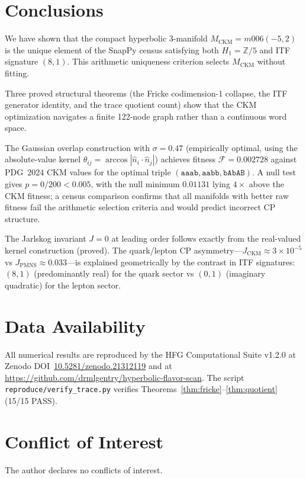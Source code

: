 \documentclass[11pt,a4paper]{article}
\theoremstyle{remark}
\newcommand{\MCKM}{M_{\mathrm{CKM}}}
\newcommand{\Zfive}{\mathbb{Z}/5}
\begin{document}
\section{Conclusions}
\label{sec:concl}

We have shown that the compact hyperbolic 3-manifold
$\MCKM = m006(-5,2)$ is the unique element of the SnapPy census
satisfying both $H_1 = \Zfive$ and ITF signature $(8,1)$.
This arithmetic uniqueness criterion selects $\MCKM$ without fitting.

Three proved structural theorems (the Fricke codimension-1 collapse,
the ITF generator identity, and the trace quotient count) show that
the CKM optimization navigates a finite 122-node graph rather than
a continuous word space.

The Gaussian overlap construction with $\sigma = 0.47$
(empirically optimal, using the absolute-value kernel
$\theta_{ij} = \arccos|\hat{n}_i \cdot \hat{n}_j|$)
achieves fitness $\mathcal{F} = 0.002728$ against PDG~2024 CKM values
for the optimal triple $(\mathtt{aaab}, \mathtt{aabb}, \mathtt{bAbAB})$.
A null test gives $p = 0/200 < 0.005$, with the null minimum
$0.01131$ lying $4\times$ above the CKM fitness;
a census comparison confirms that all manifolds with better raw fitness
fail the arithmetic selection criteria and would predict incorrect CP structure.

The Jarlskog invariant $J = 0$ at leading order follows exactly from
the real-valued kernel construction (proved).
The quark/lepton CP asymmetry---$J_\mathrm{CKM} \approx 3 \times 10^{-5}$
vs $J_\mathrm{PMNS} \approx 0.033$---is explained geometrically
by the contrast in ITF signatures: $(8,1)$ (predominantly real) for
the quark sector vs $(0,1)$ (imaginary quadratic) for the lepton sector.

\section*{Data Availability}
All numerical results are reproduced by the HFG Computational Suite v1.2.0
at Zenodo DOI~\href{https://doi.org/10.5281/zenodo.21312119}{10.5281/zenodo.21312119}
and at \url{https://github.com/drmlgentry/hyperbolic-flavor-scan}.
The script \texttt{reproduce/verify\_trace.py} verifies
Theorems~\ref{thm:fricke}--\ref{thm:quotient} (15/15 PASS).

\section*{Conflict of Interest}
The author declares no conflicts of interest.
\end{document}
